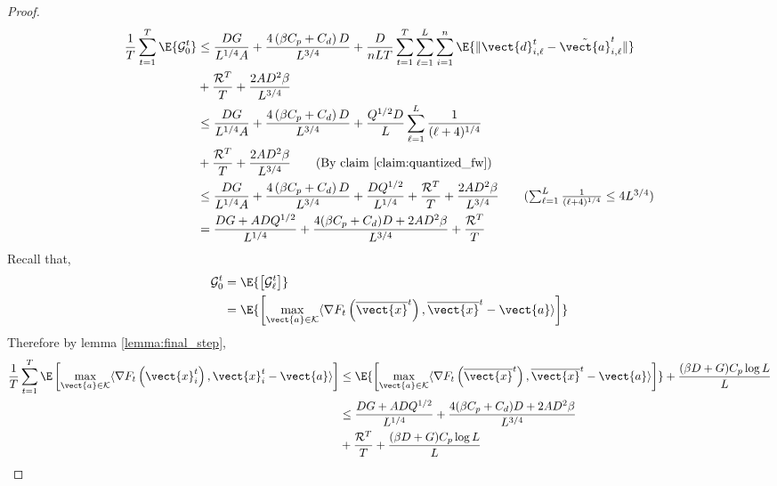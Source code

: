 \begin{proof}
\begin{align*}
    \frac{1}{T}\sum_{t=1}^{T} \E{\mathcal{G}_0^t}
     &\leq \frac{DG}{L^{1/4}A} + \frac{4\left(\beta C_p + C_d\right)D}{L^{3/4}} + \frac{D}{nLT} \sum_{t=1}^{T} \sum_{\ell=1}^{L} \sum_{i=1}^{n} \E {\| \vect{d}^t_{i,\ell} - \Tilde{\vect{a}}^{t}_{i, \ell} \|} \\
    &+ \frac{\mathcal{R}^T}{T} + \frac{2AD^2\beta}{L^{3/4}}\\
    &\leq \frac{DG}{L^{1/4}A} + \frac{4\left(\beta C_p + C_d\right)D}{L^{3/4}} + \frac{Q^{1/2}D}{L}    \sum_{\ell=1}^{L} \frac{1}{(\ell+4)^{1/4}} \\
    &+ \frac{\mathcal{R}^T}{T} + \frac{2AD^2\beta}{L^{3/4}}
    \tag{By claim \ref{claim:quantized_fw}}\\
    &\leq \frac{DG}{L^{1/4}A} + \frac{4\left(\beta C_p + C_d\right)D}{L^{3/4}} + \frac{D Q^{1/2}}{L^{1/4}}  + \frac{\mathcal{R}^T}{T} + \frac{2AD^2\beta}{L^{3/4}}
    \tag{$\sum_{\ell = 1}^{L}\frac{1}{(\ell+4)^{1/4}} \leq 4 L^{3/4}$}\\
    &= \frac{DG + ADQ^{1/2}}{L^{1/4}} + \frac{4(\beta C_p + C_d) D + 2AD^2\beta}{L^{3/4}}
     + \frac{\mathcal{R}^T}{T}
\end{align*}
Recall that, 
\begin{align*}
    \mathcal{G}_0^t &= \E{ \left[ \mathcal{G}_{\ell}^t \right]} \\
    &= \E{\left[ \max_{\vect{a} \in \mathcal{K}} \langle \nabla F_t\left( \overline{\vect{x}}^t \right), \overline{\vect{x}}^t - \vect{a} \rangle \right]} 
\end{align*}
Therefore by lemma \ref{lemma:final_step}, 
\begin{align*}
    \frac{1}{T} \sum_{t=1}^T \E\left[ \max_{\vect{a} \in \mathcal{K}} \langle \nabla F_t\left( \vect{x}_i^t \right), \vect{x}_i^t - \vect{a} \rangle \right] &\leq \E{\left[ \max_{\vect{a} \in \mathcal{K}} \langle \nabla F_t\left( \overline{\vect{x}}^t \right), \overline{\vect{x}}^t - \vect{a} \rangle \right]} + \frac{(\beta D + G)C_p \log L}{L} \\
    &\leq \frac{DG + ADQ^{1/2}}{L^{1/4}} + \frac{4(\beta C_p + C_d) D + 2AD^2\beta}{L^{3/4}} \\
    &+ \frac{\mathcal{R}^T}{T} + \frac{(\beta D + G)C_p \log L}{L}
\end{align*}
\end{proof}

